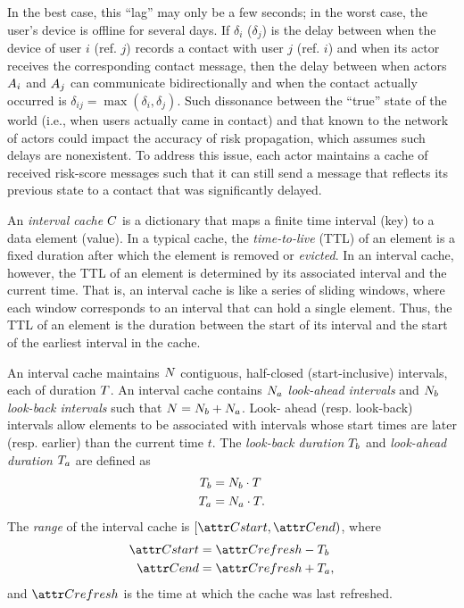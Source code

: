 In the best case, this ``lag'' may only be a few seconds; in the worst case, the user's device is offline for several days. If $\delta_i$ ($\delta_j$) is the delay between when the device of user $i$ (ref. $j$) records a contact with user $j$ (ref. $i$) and when its actor receives the corresponding contact message, then the delay between when actors $A_i$ and $A_j$ can communicate bidirectionally and when the contact actually occurred is $\delta_{ij} = \max(\delta_i, \delta_j)$. Such dissonance between the ``true'' state of the world (i.e., when users actually came in contact) and that known to the network of actors could impact the accuracy of risk propagation, which assumes such delays are nonexistent. To address this issue, each actor maintains a cache of received risk-score messages such that it can still send a message that reflects its previous state to a contact that was significantly delayed.

An \emph{interval cache} $C$ is a dictionary that maps a finite time interval (key) to a data element (value). In a typical cache, the \emph{time-to-live} (TTL) of an element is a fixed duration after which the element is removed or \emph{evicted}. In an interval cache, however, the TTL of an element is determined by its associated interval and the current time. That is, an interval cache is like a series of sliding windows, where each window corresponds to an interval that can hold a single element. Thus, the TTL of an element is the duration between the start of its interval and the start of the earliest interval in the cache.

An interval cache maintains $N$ contiguous, half-closed (start-inclusive) intervals, each of duration $T$. An interval cache contains $N_a$ \emph{look-ahead intervals} and $N_b$ \emph{look-back intervals} such that $N = N_b + N_a$. Look- ahead (resp. look-back) intervals allow elements to be associated with intervals whose start times are later (resp. earlier) than the current time $t$. The \emph{look-back duration} $T_b$ and \emph{look-ahead duration} $T_a$ are defined as
%
\begin{align*}
	T_b &= N_b \cdot T \\
	T_a &= N_a \cdot T .
\end{align*}
The \emph{range} of the interval cache is $[\aCacheStart, \aCacheEnd)$, where
%
\begin{align*}
	\aCacheStart &= \aCacheRefresh - \pCacheLookBack \\
	\aCacheEnd &= \aCacheRefresh + \pCacheLookAhead,
\end{align*}
%
and $\aCacheRefresh$ is the time at which the cache was last refreshed.

